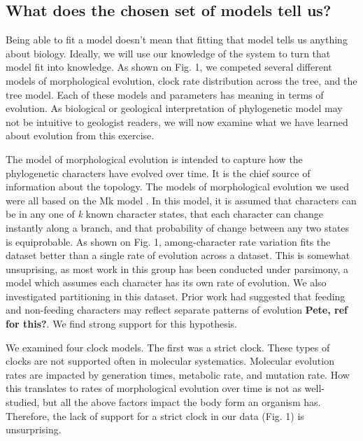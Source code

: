 \documentclass{article}
\begin{document}
\subsection{What does the chosen set of models tell us?}

Being able to fit a model doesn't mean that fitting that model tells us anything about biology. 
Ideally, we will use our knowledge of the system to turn that model fit into knowledge. 
As shown on Fig. 1, we competed several different models of morphological evolution, clock rate distribution across the tree, and the tree model. 
Each of these models and parameters has meaning in terms of evolution. 
As biological or geological interpretation of phylogenetic model may not be intuitive to geologist readers, we will now examine what we have learned about evolution from this exercise.

The model of morphological evolution is intended to capture how the phylogenetic characters have evolved over time.
It is the chief source of information about the topology.
The models of morphological evolution we used were all based on the Mk model \citep{Lewis2001}. 
In this model, it is assumed that characters can be in any one of \textit{k} known character states, that each character can change instantly along a branch, and that probability of change between any two states is equiprobable.
As shown on Fig. 1, among-character rate variation fits the dataset better than a single rate of evolution across a dataset.
This is somewhat unsuprising, as most work in this group has been conducted under parsimony, a model which assumes each character has its own rate of evolution.
We also investigated partitioning in this dataset.
Prior work had suggested that feeding and non-feeding characters may reflect separate patterns of evolution \textbf{Pete, ref for this?}.
We find strong support for this hypothesis.

We examined four clock models.
The first was a strict clock. 
These types of clocks are not supported often in molecular systematics.
Molecular evolution rates are impacted by generation times,  metabolic rate, and mutation rate.
How this translates to rates of morphological evolution over time is not as well-studied, but all the above factors impact the body form an organism has.
Therefore, the lack of support for a strict clock in our data (Fig. 1) is unsurprising.
\end{document}
